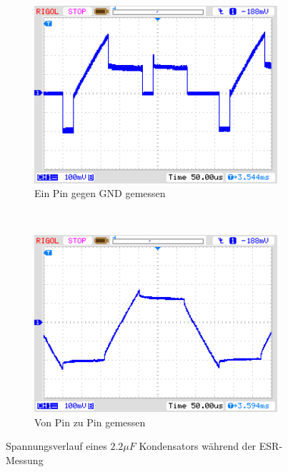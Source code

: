 \begin{figure}[H]
  \begin{subfigure}[b]{9cm}
    \centering
    \includegraphics[width=9cm]{../PNG/ESR_2uF_pin2GND.png}
    \caption{Ein Pin gegen GND gemessen}
  \end{subfigure}
  ~
  \begin{subfigure}[b]{9cm}
    \centering
    \includegraphics[width=9cm]{../PNG/ESR_2uF_pin2pin.png}
    \caption{Von Pin zu Pin gemessen}
  \end{subfigure}
  \caption{Spannungsverlauf eines \(2.2\mu F\) Kondensators während der ESR-Messung}
  \label{pic:esr2}
\end{figure}

